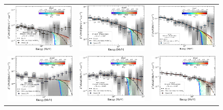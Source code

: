 \documentclass[twocolumn,linenumbers]{aastex62}
\begin{document}
\begin{figure}
    \centering
    \begin{tabular}{ccc}
    \includegraphics[width=0.32\linewidth]{sed_PKSB1222+216_t001_LogParabola_3min_ring_emin1000.pdf} &
    \includegraphics[width=0.32\linewidth]{sed_3C279_t001_LogParabola_3min_ring_emin1000.pdf} & 
    \includegraphics[width=0.32\linewidth]{sed_3C279_t003_LogParabola_3min_ring_emin1000.pdf}\\
    \includegraphics[width=0.32\linewidth]{sed_PKS1510-089_t005_LogParabola_3min_ring_emin1000.pdf} &
    \includegraphics[width=0.32\linewidth]{sed_PKS1510-089_t006_LogParabola_3min_ring_emin1000.pdf} & 
    \includegraphics[width=0.32\linewidth]{sed_3C454p3_t001_LogParabola_3min_ring_emin1000.pdf}\\

\end{tabular}
\end{figure}
\end{document}
